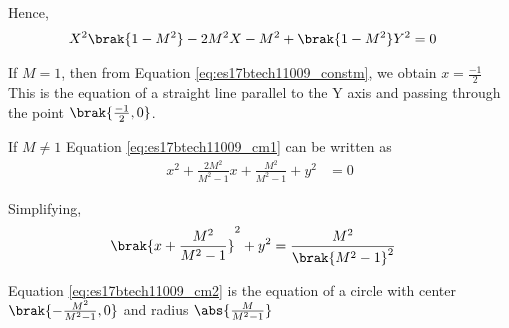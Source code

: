 \begin{enumerate}[label=\thesection.\arabic*.,ref=\thesection.\theenumi]
Hence,
\begin{align}
X^{2}\brak{1-M^{2}}-2M^{2}X-M^{2}+\brak{1-M^{2}}Y^{2} &= 0
\label{eq:es17btech11009_cm1}
\end{align}

If $M=1$, then from Equation \eqref{eq:es17btech11009_constm}, we obtain $x =\frac{-1}{2}$ This is the equation of a straight line parallel to the Y axis and passing through the point $\brak{\frac{-1}{2},0}$.

If $M \neq 1$ Equation \eqref{eq:es17btech11009_cm1} can be written as
\begin{align}
x^{2}+\frac{2M^{2}}{M^{2}-1}x+\frac{M^{2}}{M^{2}-1}+y^{2} &= 0
\end{align}

Simplifying,
\begin{align}
\brak{x+\frac{M^{2}}{M^{2}-1}}^{2}+y^{2} &= \frac{M^{2}}{\brak{M^{2}-1}^{2}}
\label{eq:es17btech11009_cm2}
\end{align}

Equation \eqref{eq:es17btech11009_cm2} is the equation of a circle with center 
$\brak{-\frac{M^{2}}{M^{2}-1},0}$ and radius $\abs{\frac{M}{M^{2}-1}}$


\end{enumerate}
